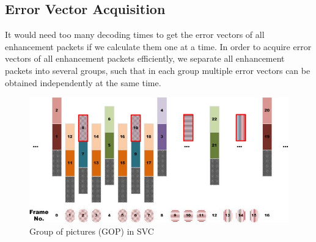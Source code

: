 \documentclass[journal]{IEEEtran}
\begin{document}
\subsection{Error Vector Acquisition}

It would need too many decoding times to get the error vectors of all enhancement packets if we calculate them one at a time. In order to acquire error vectors of all enhancement packets efficiently, we separate all enhancement packets into several groups, such that in each group multiple error vectors can be obtained independently at the same time.
 
\begin{figure}[h]
\centering
\includegraphics[width = 1.0\linewidth]{GOPStructure.jpg}
\caption{Group of pictures (GOP) in SVC \label{fig:GOP_Structure}}
\end{figure}
 
\end{document}
